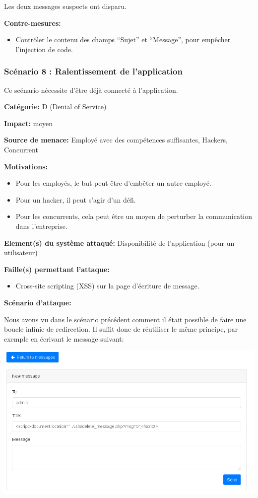 \documentclass{article}
\begin{document}
Les deux messages suspects ont disparu.

\textbf{Contre-mesures:}

\begin{itemize}

\item
  Contrôler le contenu des champs ``Sujet'' et ``Message'', pour
  empêcher l'injection de code.
\end{itemize}

\subsubsection{Scénario 8 : Ralentissement de l'application}

Ce scénario nécessite d'être déjà connecté à l'application.

\textbf{Catégorie:} D (Denial of Service)

\textbf{Impact:} moyen

\textbf{Source de menace:} Employé avec des compétences suffisantes,
Hackers, Concurrent

\textbf{Motivations:}

\begin{itemize}

\item
  Pour les employés, le but peut être d'embêter un autre employé.
\item
  Pour un hacker, il peut s'agir d'un défi.
\item
  Pour les concurrents, cela peut être un moyen de perturber la
  communication dans l'entreprise.
\end{itemize}

\textbf{Element(s) du système attaqué:} Disponibilité de l'application
(pour un utilisateur)

\textbf{Faille(s) permettant l'attaque:}

\begin{itemize}

\item
  Cross-site scripting (XSS) sur la page d'écriture de message.
\end{itemize}

\textbf{Scénario d'attaque:}

Nous avons vu dans le scénario précédent comment il était possible de
faire une boucle infinie de redirection. Il suffit donc de réutiliser le
même principe, par exemple en écrivant le message suivant:

\includegraphics{images/loop1.PNG}
\end{document}
